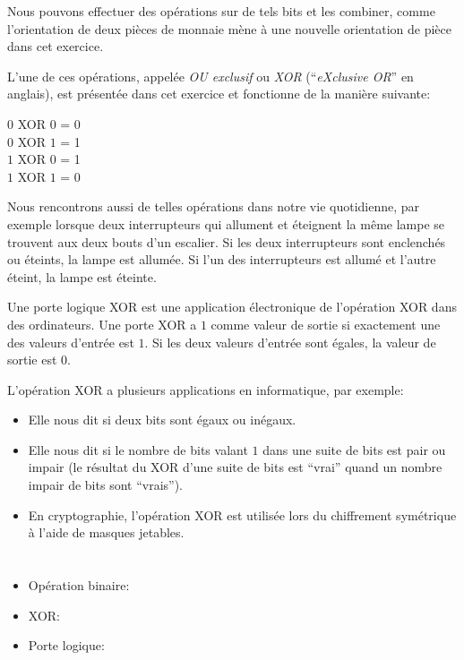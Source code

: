 {{Nous pouvons effectuer des opérations sur de tels bits et les combiner, comme l’orientation de deux pièces de monnaie mène à une nouvelle orientation de pièce dans cet exercice.

L’une de ces opérations, appelée \emph{OU exclusif} ou \emph{XOR} (“\emph{eXclusive OR}” en anglais), est présentée dans cet exercice et fonctionne de la manière suivante:

\begin{adjustwidth}{1.5em}{0em}
$0$ XOR $0$ = 0 \\
$0$ XOR $1$ = 1 \\
$1$ XOR $0$ = 1 \\
$1$ XOR $1$ = 0
\end{adjustwidth}

Nous rencontrons aussi de telles opérations dans notre vie quotidienne, par exemple lorsque deux interrupteurs qui allument et éteignent la même lampe se trouvent aux deux bouts d’un escalier. Si les deux interrupteurs sont enclenchés ou éteints, la lampe est allumée. Si l’un des interrupteurs est allumé et l’autre éteint, la lampe est éteinte.

Une porte logique XOR est une application électronique de l’opération XOR dans des ordinateurs. Une porte XOR a $1$ comme valeur de sortie si exactement une des valeurs d’entrée est $1$. Si les deux valeurs d’entrée sont égales, la valeur de sortie est $0$.

L’opération XOR a plusieurs applications en informatique, par exemple:

\begin{itemize}
  \item Elle nous dit si deux bits sont égaux ou inégaux.
  \item Elle nous dit si le nombre de bits valant $1$ dans une suite de bits est pair ou impair (le résultat du XOR d’une suite de bits est “vrai” quand un nombre impair de bits sont “vrais”).
  \item En cryptographie, l’opération XOR est utilisée lors du chiffrement symétrique à l’aide de masques jetables.
\end{itemize}



\section*{\BrochureWebsitesAndKeywords}
{\raggedright
\begin{itemize}
  \item Opération binaire: \href{https://fr.wikipedia.org/wiki/Op\%C3\%A9ration_binaire}{}
  \item XOR: \href{https://fr.wikipedia.org/wiki/Fonction_OU_exclusif}{}
  \item Porte logique: \href{https://fr.wikipedia.org/wiki/Fonction_logique}{}
\end{itemize}


}}}
